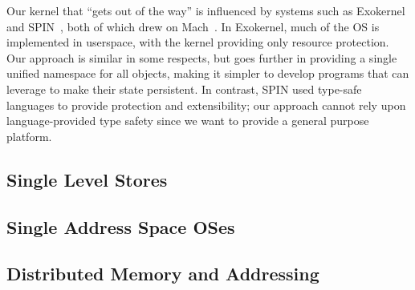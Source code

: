 {    Our kernel that ``gets out of the way'' is influenced by systems
    such as Exokernel~\cite{engler:sosp95} and SPIN~\cite{bershad:sosp95}, both of
    which drew on Mach~\cite{accetta:usenix86s}. In
    Exokernel, much of the OS is implemented in userspace, with the kernel providing only resource protection. Our approach is
    similar in some respects, but goes further in providing a single unified
    namespace for all objects, making it simpler to develop programs
    that can leverage \NVM to make their state persistent.
    In contrast, SPIN used type-safe languages to provide protection and
    extensibility; our approach cannot rely upon language-provided type safety since
    we want to provide a general purpose platform.

}


\subsection{Single Level Stores}

\subsection{Single Address Space OSes}

\subsection{Distributed Memory and Addressing}